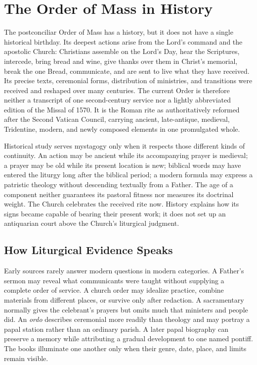 \section{The Order of Mass in History}

The postconciliar Order of Mass has a history, but it does not have a single historical birthday. Its deepest actions arise from the Lord's command and the apostolic Church: Christians assemble on the Lord's Day, hear the Scriptures, intercede, bring bread and wine, give thanks over them in Christ's memorial, break the one Bread, communicate, and are sent to live what they have received. Its precise texts, ceremonial forms, distribution of ministries, and transitions were received and reshaped over many centuries. The current Order is therefore neither a transcript of one second-century service nor a lightly abbreviated edition of the Missal of 1570. It is the Roman rite as authoritatively reformed after the Second Vatican Council, carrying ancient, late-antique, medieval, Tridentine, modern, and newly composed elements in one promulgated whole.

Historical study serves mystagogy only when it respects those different kinds of continuity. An action may be ancient while its accompanying prayer is medieval; a prayer may be old while its present location is new; biblical words may have entered the liturgy long after the biblical period; a modern formula may express a patristic theology without descending textually from a Father. The age of a component neither guarantees its pastoral fitness nor measures its doctrinal weight. The Church celebrates the received rite now. History explains how its signs became capable of bearing their present work; it does not set up an antiquarian court above the Church's liturgical judgment.

\subsection{How Liturgical Evidence Speaks}

Early sources rarely answer modern questions in modern categories. A Father's sermon may reveal what communicants were taught without supplying a complete order of service. A church order may idealize practice, combine materials from different places, or survive only after redaction. A sacramentary normally gives the celebrant's prayers but omits much that ministers and people did. An \emph{ordo} describes ceremonial more readily than theology and may portray a papal station rather than an ordinary parish. A later papal biography can preserve a memory while attributing a gradual development to one named pontiff. The books illuminate one another only when their genre, date, place, and limits remain visible.

